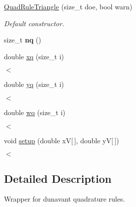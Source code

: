\begin{DoxyCompactItemize}
\item 
\hyperlink{classHArDCore2D_1_1QuadRuleTriangle_a83a432b56c03fffa615ec85f5dfd57d7}{Quad\+Rule\+Triangle} (size\+\_\+t doe, bool warn)
\begin{DoxyCompactList}\small\item\em Default constructor. \end{DoxyCompactList}\item 
\mbox{\label{classHArDCore2D_1_1QuadRuleTriangle_a5071f69f8f99171329a13943d5fe515d}} 
size\+\_\+t {\bfseries nq} ()
\item 
double \hyperlink{classHArDCore2D_1_1QuadRuleTriangle_a98156eda410a5aa6f9787ce920358fca}{xq} (size\+\_\+t i)
\begin{DoxyCompactList}\small\item\em $<$ \end{DoxyCompactList}\item 
\mbox{\label{classHArDCore2D_1_1QuadRuleTriangle_a0aa8f08c87bc5b2bc8180c149e16a4c2}} 
double \hyperlink{classHArDCore2D_1_1QuadRuleTriangle_a0aa8f08c87bc5b2bc8180c149e16a4c2}{yq} (size\+\_\+t i)
\begin{DoxyCompactList}\small\item\em $<$ \end{DoxyCompactList}\item 
\mbox{\label{classHArDCore2D_1_1QuadRuleTriangle_a47725c429eec36e849a8bbf69a924303}} 
double \hyperlink{classHArDCore2D_1_1QuadRuleTriangle_a47725c429eec36e849a8bbf69a924303}{wq} (size\+\_\+t i)
\begin{DoxyCompactList}\small\item\em $<$ \end{DoxyCompactList}\item 
void \hyperlink{classHArDCore2D_1_1QuadRuleTriangle_aa2cd3081837b1cb46f6573ceb16de7b2}{setup} (double xV\mbox{[}$\,$\mbox{]}, double yV\mbox{[}$\,$\mbox{]})
\begin{DoxyCompactList}\small\item\em $<$ \end{DoxyCompactList}\end{DoxyCompactItemize}


\subsection{Detailed Description}
Wrapper for dunavant quadrature rules. 

